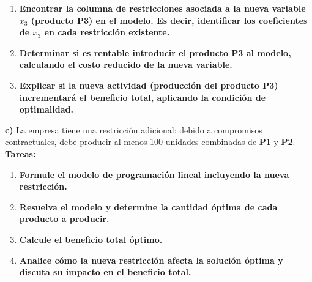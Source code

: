 \documentclass{article}
\begin{document}
\begin{problem}
\begin{enumerate}
    \item \textbf{Encontrar la columna de restricciones asociada a la nueva variable \( x_3 \) (producto P3) en el modelo. Es decir, identificar los coeficientes de \( x_3 \) en cada restricción existente.}

    \item \textbf{Determinar si es rentable introducir el producto P3 al modelo, calculando el costo reducido de la nueva variable.}

    \item \textbf{Explicar si la nueva actividad (producción del producto P3) incrementará el beneficio total, aplicando la condición de optimalidad.}
\end{enumerate}

\textbf{c)} La empresa tiene una restricción adicional: debido a compromisos contractuales, debe producir al menos 100 unidades combinadas de \textbf{P1} y \textbf{P2}.\\

\textbf{Tareas:}

\begin{enumerate}
    \item \textbf{Formule el modelo de programación lineal incluyendo la nueva restricción.}
    \item \textbf{Resuelva el modelo y determine la cantidad óptima de cada producto a producir.}
    \item \textbf{Calcule el beneficio total óptimo.}
    \item \textbf{Analice cómo la nueva restricción afecta la solución óptima y discuta su impacto en el beneficio total.}
\end{enumerate}

\end{problem}
\end{document}
